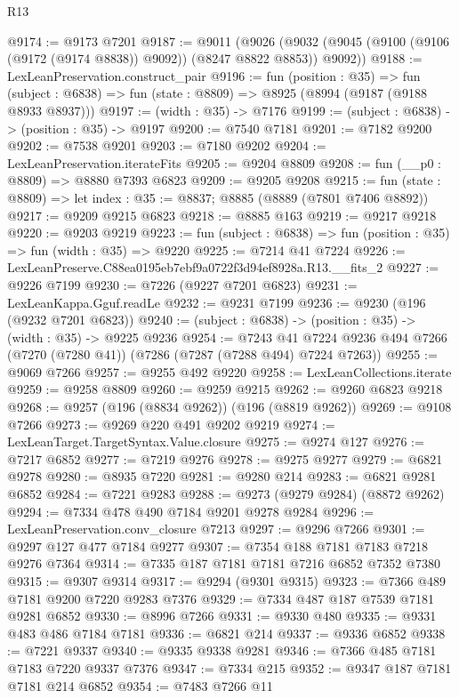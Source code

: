 \begin{lexlean}{R13}
\begin{coremodule}
@9174 := @9173 @7201
@9187 := @9011
    (@9026 (@9032 (@9045 (@9100 (@9106 (@9172 (@9174 @8838)) @9092)) (@8247 @8822 @8853)) @9092))
@9188 := LexLeanPreservation.construct_pair
@9196 := fun (position : @35) =>
  fun (subject : @6838) => fun (state : @8809) => @8925 (@8994 (@9187 (@9188 @8933 @8937)))
@9197 := (width : @35) -> @7176
@9199 := (subject : @6838) -> (position : @35) -> @9197
@9200 := @7540 @7181
@9201 := @7182 @9200
@9202 := @7538 @9201
@9203 := @7180 @9202
@9204 := LexLeanPreservation.iterateFits
@9205 := @9204 @8809
@9208 := fun (__p0 : @8809) => @8880 @7393 @6823
@9209 := @9205 @9208
@9215 := fun (state : @8809) => let index : @35 := @8837; @8885 (@8889 (@7801 @7406 @8892))
@9217 := @9209 @9215 @6823
@9218 := @8885 @163
@9219 := @9217 @9218
@9220 := @9203 @9219
@9223 := fun (subject : @6838) => fun (position : @35) => fun (width : @35) => @9220
@9225 := @7214 @41 @7224
@9226 := LexLeanPreserve.C88ea0195eb7ebf9a0722f3d94ef8928a.R13.__fits_2
@9227 := @9226 @7199
@9230 := @7226 (@9227 @7201 @6823)
@9231 := LexLeanKappa.Gguf.readLe
@9232 := @9231 @7199
@9236 := @9230 (@196 (@9232 @7201 @6823))
@9240 := (subject : @6838) -> (position : @35) -> (width : @35) -> @9225 @9236
@9254 := @7243
    @41
    @7224
    @9236
    @494
    @7266
    (@7270 (@7280 @41))
    (@7286 (@7287 (@7288 @494) @7224 @7263))
@9255 := @9069 @7266
@9257 := @9255 @492 @9220
@9258 := LexLeanCollections.iterate
@9259 := @9258 @8809
@9260 := @9259 @9215
@9262 := @9260 @6823 @9218
@9268 := @9257 (@196 (@8834 @9262)) (@196 (@8819 @9262))
@9269 := @9108 @7266
@9273 := @9269 @220 @491 @9202 @9219
@9274 := LexLeanTarget.TargetSyntax.Value.closure
@9275 := @9274 @127
@9276 := @7217 @6852
@9277 := @7219 @9276
@9278 := @9275 @9277
@9279 := @6821 @9278
@9280 := @8935 @7220
@9281 := @9280 @214
@9283 := @6821 @9281 @6852
@9284 := @7221 @9283
@9288 := @9273 (@9279 @9284) (@8872 @9262)
@9294 := @7334 @478 @490 @7184 @9201 @9278 @9284
@9296 := LexLeanPreservation.conv_closure @7213
@9297 := @9296 @7266
@9301 := @9297 @127 @477 @7184 @9277
@9307 := @7354 @188 @7181 @7183 @7218 @9276 @7364
@9314 := @7335 @187 @7181 @7181 @7216 @6852 @7352 @7380
@9315 := @9307 @9314
@9317 := @9294 (@9301 @9315)
@9323 := @7366 @489 @7181 @9200 @7220 @9283 @7376
@9329 := @7334 @487 @187 @7539 @7181 @9281 @6852
@9330 := @8996 @7266
@9331 := @9330 @480
@9335 := @9331 @483 @486 @7184 @7181
@9336 := @6821 @214
@9337 := @9336 @6852
@9338 := @7221 @9337
@9340 := @9335 @9338 @9281
@9346 := @7366 @485 @7181 @7183 @7220 @9337 @7376
@9347 := @7334 @215
@9352 := @9347 @187 @7181 @7181 @214 @6852
@9354 := @7483 @7266 @11

\end{coremodule}
\end{lexlean}

